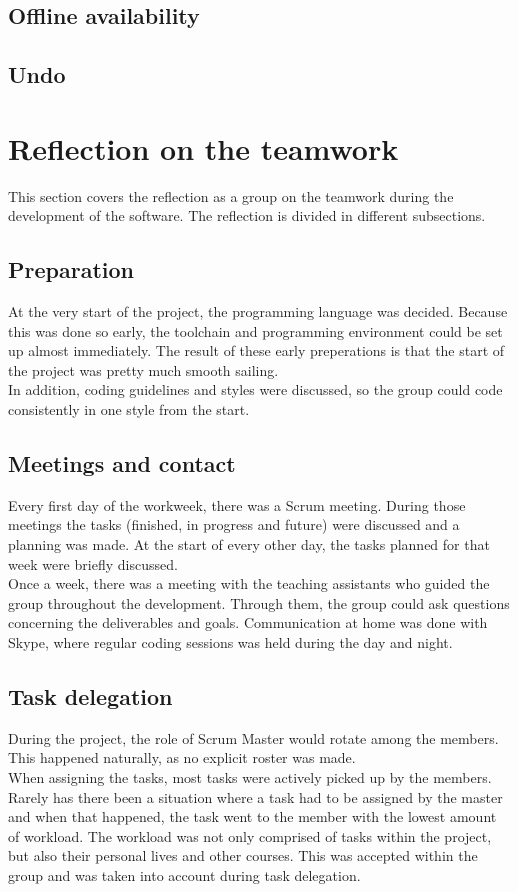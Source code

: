 \documentclass[10pt,a4paper]{report}
\begin{document}
		\subsection{Offline availability}
		
		\subsection{Undo}
	
	\section{Reflection on the teamwork}
		This section covers the reflection as a group on the teamwork during the development of the software. The reflection is divided in different subsections.
		\subsection{Preparation}
			At the very start of the project, the programming language was decided. Because this was done so early, the toolchain and programming environment could be set up almost immediately. The result of these early preperations is that the start of the project was pretty much smooth sailing. \\
			In addition, coding guidelines and styles were discussed, so the group could code consistently in one style from the start.
		
		\subsection{Meetings and contact}
			Every first day of the workweek, there was a Scrum meeting. During those meetings the tasks (finished, in progress and future) were discussed and a planning was made. At the start of every other day, the tasks planned for that week were briefly discussed. \\
			Once a week, there was a meeting with the teaching assistants who guided the group throughout the development. Through them, the group could ask questions concerning the deliverables and goals.
			Communication at home was done with Skype, where regular coding sessions was held during the day and night.

		\subsection{Task delegation}
			During the project, the role of Scrum Master would rotate among the members. This happened naturally, as no explicit roster was made. \\
			When assigning the tasks, most tasks were actively picked up by the members. Rarely has there been a situation where a task had to be assigned by the master and when that happened, the task went to the member with the lowest amount of workload. The workload was not only comprised of tasks within the project, but also their personal lives and other courses. This was accepted within the group and was taken into account during task delegation.
\end{document}
